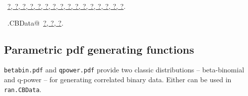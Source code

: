 \documentclass[reqno]{amsart}
\renewcommand{\NWlink}[2]{\hyperlink{#1}{#2}}
\begin{document}
\begin{flushleft}
\begin{list}{}{\setlength{\itemsep}{-\parsep}\setlength{\itemindent}{-\leftmargin}}
\item \NWtxtFileDefBy\ \NWlink{nuweb?}{?}\NWlink{nuweb?}{, ?}\NWlink{nuweb?}{, ?}\NWlink{nuweb?}{, ?}\NWlink{nuweb?}{, ?}\NWlink{nuweb?}{, ?}\NWlink{nuweb?}{, ?}\NWlink{nuweb?}{, ?}\NWlink{nuweb?}{, ?}\NWlink{nuweb?}{, ?}\NWlink{nuweb?}{, ?}\NWlink{nuweb?}{, ?}\NWlink{nuweb?}{, ?}\NWlink{nuweb?}{, ?}\NWlink{nuweb?}{, ?}\NWlink{nuweb?}{, ?}.
\item \NWtxtIdentsDefed\nobreak\  \verb@ran.CBData@\nobreak\ \NWlink{nuweb?}{?}\NWlink{nuweb?}{, ?}\NWlink{nuweb?}{, ?}.
\item{}
\end{list}
\vspace{4ex}
\end{flushleft}
\subsection{Parametric pdf generating functions}
\texttt{betabin.pdf} and \texttt{qpower.pdf} provide two classic distributions --
beta-binomial and q-power -- for generating correlated binary data. Either
can be used in \texttt{ran.CBData}.
\end{document}
